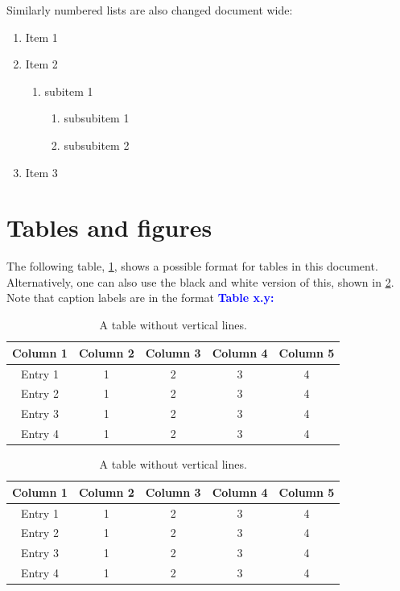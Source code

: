 Similarly numbered lists are also changed document wide:

\begin{enumerate}
    \item Item 1
    \item Item 2
    \begin{enumerate}
        \item subitem 1
        \begin{enumerate}
            \item subsubitem 1
            \item subsubitem 2
        \end{enumerate}
    \end{enumerate}
    \item Item 3
\end{enumerate}

\section{Tables and figures}
The following table, \cref{table: style 1}, shows a possible format for tables in this document. Alternatively, one can also use the black and white version of this, shown in \cref{table: style 2}. Note that caption labels are in the format \textbf{\textcolor{blue}{Table x.y:} }
\begin{table}[ht]
\centering
\caption{A table without vertical lines.}
\begin{tabular}[t]{ccccc}
\toprule
\color{blue}\textbf{Column 1}&\color{blue}\textbf{Column 2}&\color{blue}\textbf{Column 3}&\color{blue}\textbf{Column 4}&\color{blue}\textbf{Column 5}\\
\midrule
Entry 1&1&2&3&4\\
Entry 2&1&2&3&4\\
Entry 3&1&2&3&4\\
Entry 4&1&2&3&4\\
\bottomrule
\end{tabular}
\label{table: style 1}
\end{table}

\begin{table}[ht]
\centering
\caption{A table without vertical lines.}
\begin{tabular}[t]{ccccc}
\toprule
\textbf{Column 1}&\textbf{Column 2}&\textbf{Column 3}&\textbf{Column 4}&\textbf{Column 5}\\
\midrule
Entry 1&1&2&3&4\\
Entry 2&1&2&3&4\\
Entry 3&1&2&3&4\\
Entry 4&1&2&3&4\\
\bottomrule
\end{tabular}
\label{table: style 2}
\end{table}

